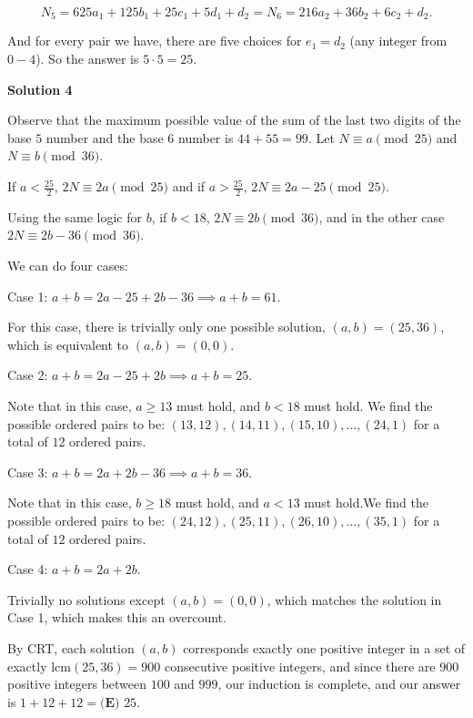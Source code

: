 \begin{enumerate}
 
 \[N_5 =  625a_1 + 125b_1 + 25c_1 + 5d_1 + d_2 = N_6 =  216a_2 + 36b_2 + 6c_2 + d_2.\] 

 And for every pair we have, there are five choices for $e_1 = d_2$ (any integer from $0 - 4$). So the answer is $5 \cdot 5 = \boxed{25}.$




\textbf{Solution 4}

Observe that the maximum possible value of the sum of the last two digits of the base $5$ number and the base $6$ number is $44+55=99$. Let $N \equiv a \pmod {25}$ and $N \equiv b \pmod {36}$. 

 If $a < \frac{25}{2}$, $2N \equiv 2a \pmod {25}$ and if $a > \frac{25}{2}$, $2N \equiv 2a - 25 \pmod {25}$.

 Using the same logic for $b$, if $b < 18$, $2N \equiv 2b \pmod {36}$, and in the other case $2N \equiv 2b - 36 \pmod {36}$.

 We can do four cases:

 Case 1: $a + b = 2a - 25 + 2b - 36 \implies a + b = 61$.

 For this case, there is trivially only one possible solution, $(a, b) = (25, 36)$, which is equivalent to $(a, b) = (0, 0)$. 

 Case 2: $a + b = 2a - 25 + 2b \implies a + b = 25$.

 Note that in this case, $a \geq 13$ must hold, and $b < 18$ must hold. We find the possible ordered pairs to be: $(13, 12), (14, 11), (15, 10), ..., (24, 1)$ for a total of $12$ ordered pairs.

 Case 3: $a + b = 2a + 2b - 36 \implies a + b = 36$.

 Note that in this case, $b \geq 18$ must hold, and $a < 13$ must hold.We find the possible ordered pairs to be: $(24, 12), (25, 11), (26, 10), ..., (35, 1)$ for a total of $12$ ordered pairs.

 Case 4: $a + b = 2a + 2b$.

 Trivially no solutions except $(a, b) = (0, 0)$, which matches the solution in Case 1, which makes this an overcount.

 By CRT, each solution $(a, b)$ corresponds exactly one positive integer in a set of exactly $\text{lcm} (25, 36) = 900$ consecutive positive integers, and since there are $900$ positive integers between $100$ and $999$, our induction is complete, and our answer is $1 + 12 + 12 = \boxed{\textbf{(E) }25}$.

 



\end{enumerate}

